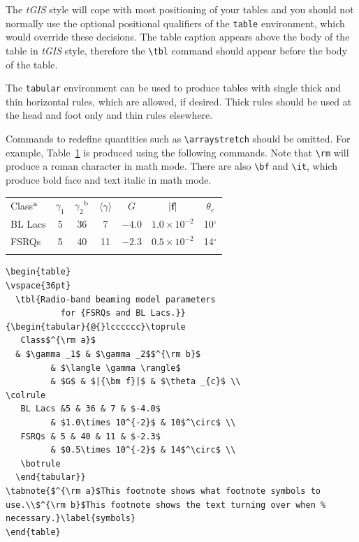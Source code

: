 \documentclass[]{tGIS2e}
\begin{document}
The {\it tGIS} style will cope with most positioning of your tables and you should not normally use the optional
positional qualifiers of the {\tt table} environment, which would override these decisions. The table caption
appears above the body of the table in {\it tGIS} style, therefore the \verb"\tbl" command should appear before
the body of the table.

The {\tt tabular} environment can be used to produce tables with single thick and thin horizontal rules, which
are allowed, if desired. Thick rules should be used at the head and foot only and thin rules elsewhere.

Commands to redefine quantities such as \verb"\arraystretch" should be omitted. For example, Table~\ref{symbols}
is produced using the following commands. Note that \verb"\rm" will produce a roman character in math mode. There
are also \verb"\bf" and \verb"\it", which produce bold face and text italic in math mode.

\begin{table}
\vspace{36pt}
{\begin{tabular}[l]{@{}lcccccc}\toprule
   Class$^{\rm a}$
  & $\gamma _1$ & $\gamma _2$$^{\rm b}$
         & $\langle \gamma \rangle$
         & $G$ & $|{\bm f}|$ & $\theta _{c}$ \\
\colrule
   BL Lacs &5 & 36 & 7 & $-4.0$
         & $1.0\times 10^{-2}$ & 10$^\circ$ \\
   FSRQs & 5 & 40 & 11 & $-2.3$
         & $0.5\times 10^{-2}$ & 14$^\circ$ \\
   \botrule
  \end{tabular}}
\label{symbols}
\end{table}


\begin{verbatim}
\begin{table}
\vspace{36pt}
  \tbl{Radio-band beaming model parameters
           for {FSRQs and BL Lacs.}}
{\begin{tabular}{@{}lcccccc}\toprule
   Class$^{\rm a}$
  & $\gamma _1$ & $\gamma _2$$^{\rm b}$
         & $\langle \gamma \rangle$
         & $G$ & $|{\bm f}|$ & $\theta _{c}$ \\
\colrule
   BL Lacs &5 & 36 & 7 & $-4.0$
         & $1.0\times 10^{-2}$ & 10$^\circ$ \\
   FSRQs & 5 & 40 & 11 & $-2.3$
         & $0.5\times 10^{-2}$ & 14$^\circ$ \\
   \botrule
  \end{tabular}}
\tabnote{$^{\rm a}$This footnote shows what footnote symbols to
use.\\$^{\rm b}$This footnote shows the text turning over when %
necessary.}\label{symbols}
\end{table}
\end{verbatim}
\end{document}
